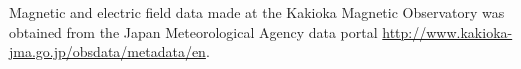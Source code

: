 \documentclass[draft,linenumbers]{agujournal2018}
\begin{document}

\acknowledgments
Magnetic and electric field data made at the Kakioka Magnetic Observatory was obtained from the Japan Meteorological Agency data portal \url{http://www.kakioka-jma.go.jp/obsdata/metadata/en}.


%

%




\end{document}
